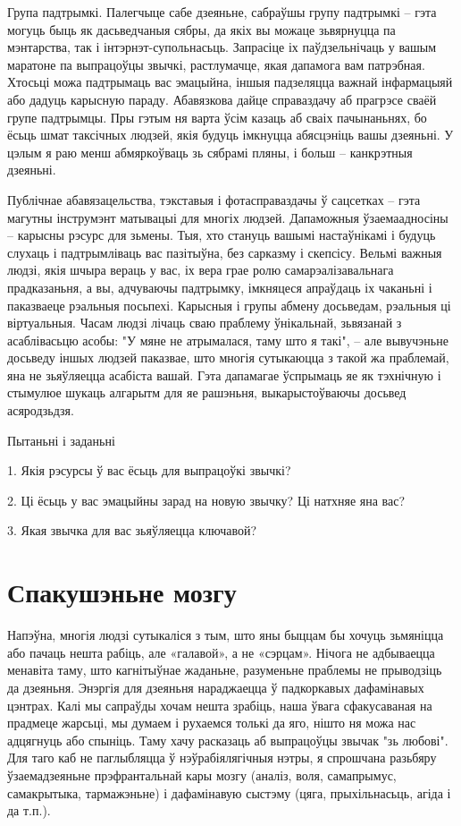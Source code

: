 Група падтрымкі. Палегчыце сабе дзеяньне, сабраўшы групу падтрымкі – гэта могуць быць як дасьведчаныя сябры, да якіх вы можаце зьвярнуцца па мэнтарства, так і інтэрнэт-супольнасьць. Запрасіце іх паўдзельнічаць у вашым маратоне па выпрацоўцы звычкі, растлумачце, якая дапамога вам патрэбная. Хтосьці можа падтрымаць вас эмацыйна, іншыя падзеляцца важнай інфармацыяй або дадуць карысную параду. Абавязкова дайце справаздачу аб прагрэсе сваёй групе падтрымцы. Пры гэтым ня варта ўсім казаць аб сваіх пачынаньнях, бо ёсьць шмат таксічных людзей, якія будуць імкнуцца абясцэніць вашы дзеяньні. У цэлым я раю менш абмяркоўваць зь сябрамі пляны, і больш – канкрэтныя дзеяньні. 

Публічнае абавязацельства, тэкставыя і фотасправаздачы ў сацсетках – гэта магутны інструмэнт матывацыі для многіх людзей. Дапаможныя ўзаемаадносіны – карысны рэсурс для зьмены. Тыя, хто стануць вашымі настаўнікамі і будуць слухаць і падтрымліваць вас пазітыўна, без сарказму і скепсісу. Вельмі важныя людзі, якія шчыра вераць у вас, іх вера грае ролю самарэалізавальнага прадказаньня, а вы, адчуваючы падтрымку, імкняцеся апраўдаць іх чаканьні і паказваеце рэальныя посьпехі. Карысныя і групы абмену досьведам, рэальныя ці віртуальныя. Часам людзі лічаць сваю праблему ўнікальнай, зьвязанай з асаблівасьцю асобы: "У мяне не атрымалася, таму што я такі", – але вывучэньне досьведу іншых людзей паказвае, што многія сутыкаюцца з такой жа праблемай, яна не зьяўляецца асабіста вашай. Гэта дапамагае ўспрымаць яе як тэхнічную і стымулюе шукаць алгарытм для яе рашэньня, выкарыстоўваючы досьвед асяродзьдзя.

Пытаньні і заданьні

1. Якія рэсурсы ў вас ёсьць для выпрацоўкі звычкі?

2. Ці ёсьць у вас эмацыйны зарад на новую звычку? Ці натхняе яна вас?

3. Якая звычка для вас зьяўляецца ключавой?


\section{Спакушэньне мозгу}

Напэўна, многія людзі сутыкаліся з тым, што яны быццам бы хочуць зьмяніцца або пачаць нешта рабіць, але «галавой», а не «сэрцам». Нічога не адбываецца менавіта таму, што кагнітыўнае жаданьне, разуменьне праблемы не прыводзіць да дзеяньня. Энэргія для дзеяньня нараджаецца ў падкоркавых дафамінавых цэнтрах. Калі мы сапраўды хочам нешта зрабіць, наша ўвага сфакусаваная на прадмеце жарсьці, мы думаем і рухаемся толькі да яго, нішто ня можа нас адцягнуць або спыніць. Таму хачу расказаць аб выпрацоўцы звычак "зь любові". Для таго каб не паглыбляцца ў нэўрабіялягічныя нэтры, я спрошчана разьбяру ўзаемадзеяньне прэфрантальнай кары мозгу (аналіз, воля, самапрымус, самакрытыка, тармажэньне) і дафамінавую сыстэму (цяга, прыхільнасьць, агіда і да т.п.).

